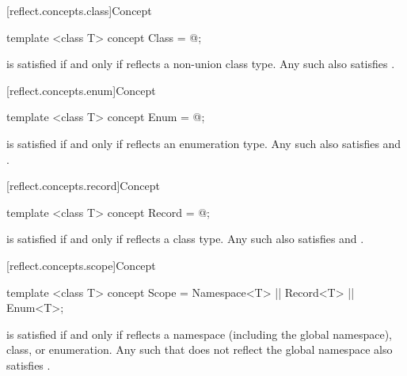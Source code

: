 [reflect.concepts.class]{Concept }

\begin{std.txt}\color{addclr}

\begin{itemdecl}
template <class T> concept Class = @\seebelow@;
\end{itemdecl}

\begin{itemdescr}
\pnum
{} is satisfied if and only if  reflects a non-union class type. Any such  also satisfies .

\end{itemdescr}
\end{std.txt}

[reflect.concepts.enum]{Concept }

\begin{std.txt}\color{addclr}

\begin{itemdecl}
template <class T> concept Enum = @\seebelow@;
\end{itemdecl}

\begin{itemdescr}
\pnum
{} is satisfied if and only if  reflects an enumeration type. Any such  also satisfies  and .

\end{itemdescr}
\end{std.txt}

[reflect.concepts.record]{Concept }

\begin{std.txt}\color{addclr}

\begin{itemdecl}
template <class T> concept Record = @\seebelow@;
\end{itemdecl}

\begin{itemdescr}
\pnum
{} is satisfied if and only if  reflects a class type. Any such  also satisfies  and .

\end{itemdescr}
\end{std.txt}

[reflect.concepts.scope]{Concept }

\begin{std.txt}\color{addclr}

\begin{itemdecl}
template <class T> concept Scope = Namespace<T> || Record<T> || Enum<T>;
\end{itemdecl}

\begin{itemdescr}
\pnum
{} is satisfied if and only if  reflects a namespace (including the global namespace), class, or enumeration. Any such  that does not reflect the global namespace also satisfies .

\end{itemdescr}
\end{std.txt}

